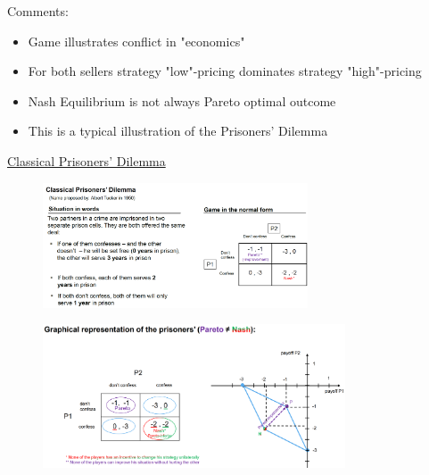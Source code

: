 \vspace{1\baselineskip}

Comments:
\begin{itemize}
    \item Game illustrates conflict in "economics"
    \item For both sellers strategy "low"-pricing dominates strategy "high"-pricing
    \item Nash Equilibrium is not always Pareto optimal outcome
    \item This is a typical illustration of the Prisoners' Dilemma
\end{itemize}

\vspace{1\baselineskip}

\underline{Classical Prisoners' Dilemma}

\begin{figure}[h]
    \centering
    \includegraphics[width=0.7\textwidth]{Pictures/Prisoners_dilemma.png}
\end{figure}

\begin{figure}[H]
    \centering
    \includegraphics[width=0.8\textwidth]{Pictures/nash_pareto.png}
\end{figure}


